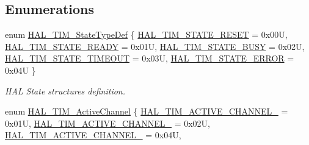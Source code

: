 \subsection*{Enumerations}
\begin{DoxyCompactItemize}
\item 
enum \mbox{\hyperlink{group___t_i_m___exported___types_gae0994cf5970e56ca4903e9151f40010c}{H\+A\+L\+\_\+\+T\+I\+M\+\_\+\+State\+Type\+Def}} \{ \newline
\mbox{\hyperlink{group___t_i_m___exported___types_ggae0994cf5970e56ca4903e9151f40010ca28011b79e60b74a6c55947c505c51cbc}{H\+A\+L\+\_\+\+T\+I\+M\+\_\+\+S\+T\+A\+T\+E\+\_\+\+R\+E\+S\+ET}} = 0x00U, 
\mbox{\hyperlink{group___t_i_m___exported___types_ggae0994cf5970e56ca4903e9151f40010ca4545554d7fa04d17e78d69d17cb7e4b3}{H\+A\+L\+\_\+\+T\+I\+M\+\_\+\+S\+T\+A\+T\+E\+\_\+\+R\+E\+A\+DY}} = 0x01U, 
\mbox{\hyperlink{group___t_i_m___exported___types_ggae0994cf5970e56ca4903e9151f40010ca1ddbfef19ad0562eb8143919b710cc12}{H\+A\+L\+\_\+\+T\+I\+M\+\_\+\+S\+T\+A\+T\+E\+\_\+\+B\+U\+SY}} = 0x02U, 
\mbox{\hyperlink{group___t_i_m___exported___types_ggae0994cf5970e56ca4903e9151f40010ca03e3339df71a74ac37820f72c2989371}{H\+A\+L\+\_\+\+T\+I\+M\+\_\+\+S\+T\+A\+T\+E\+\_\+\+T\+I\+M\+E\+O\+UT}} = 0x03U, 
\newline
\mbox{\hyperlink{group___t_i_m___exported___types_ggae0994cf5970e56ca4903e9151f40010ca318cceb243cb9ca9e01833913e4f90ea}{H\+A\+L\+\_\+\+T\+I\+M\+\_\+\+S\+T\+A\+T\+E\+\_\+\+E\+R\+R\+OR}} = 0x04U
 \}
\begin{DoxyCompactList}\small\item\em H\+AL State structures definition. \end{DoxyCompactList}\item 
enum \mbox{\hyperlink{group___t_i_m___exported___types_gaa3fa7bcbb4707f1151ccfc90a8cf9706}{H\+A\+L\+\_\+\+T\+I\+M\+\_\+\+Active\+Channel}} \{ \newline
\mbox{\hyperlink{group___t_i_m___exported___types_ggaa3fa7bcbb4707f1151ccfc90a8cf9706a2024e95c48b58ec9b2115faa276e3fad}{H\+A\+L\+\_\+\+T\+I\+M\+\_\+\+A\+C\+T\+I\+V\+E\+\_\+\+C\+H\+A\+N\+N\+E\+L\+\_}} = 0x01U, 
\mbox{\hyperlink{group___t_i_m___exported___types_ggaa3fa7bcbb4707f1151ccfc90a8cf9706ae80e6a1dd1c479f504219c0fec2f3322}{H\+A\+L\+\_\+\+T\+I\+M\+\_\+\+A\+C\+T\+I\+V\+E\+\_\+\+C\+H\+A\+N\+N\+E\+L\+\_}} = 0x02U, 
\mbox{\hyperlink{group___t_i_m___exported___types_ggaa3fa7bcbb4707f1151ccfc90a8cf9706acc3fcf4ee6d91744c4bc6a5eccde2601}{H\+A\+L\+\_\+\+T\+I\+M\+\_\+\+A\+C\+T\+I\+V\+E\+\_\+\+C\+H\+A\+N\+N\+E\+L\+\_}} = 0x04U, 

\end{DoxyCompactItemize}
